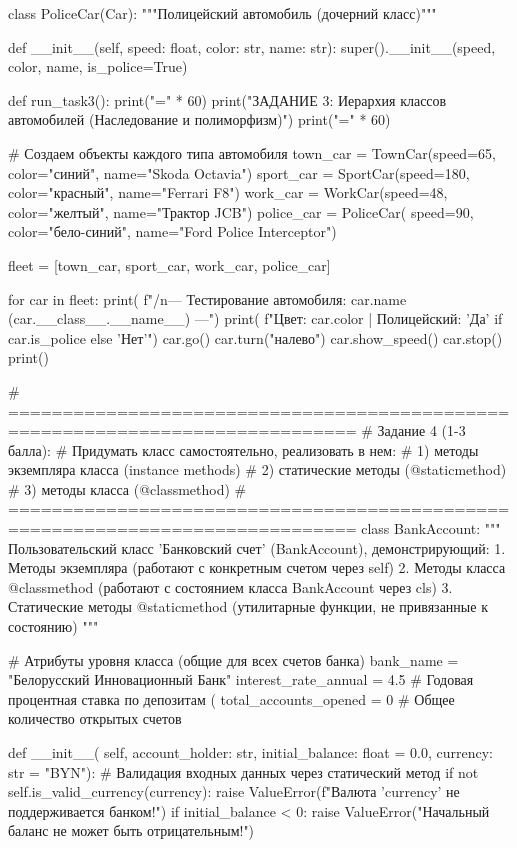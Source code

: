 \documentclass[14pt,a4paper]{extarticle}
\begin{document}
\begin{CodeListing}
class PoliceCar(Car):
    """Полицейский автомобиль (дочерний класс)"""

    def __init__(self, speed: float, color: str, name: str):
        super().__init__(speed, color, name, is_police=True)


def run_task3():
    print("=" * 60)
    print("ЗАДАНИЕ 3: Иерархия классов автомобилей (Наследование и полиморфизм)")
    print("=" * 60)

    # Создаем объекты каждого типа автомобиля
    town_car = TownCar(speed=65, color="синий", name="Skoda Octavia")
    sport_car = SportCar(speed=180, color="красный", name="Ferrari F8")
    work_car = WorkCar(speed=48, color="желтый", name="Трактор JCB")
    police_car = PoliceCar(
        speed=90,
        color="бело-синий",
        name="Ford Police Interceptor")

    fleet = [town_car, sport_car, work_car, police_car]

    for car in fleet:
        print(
            f"/n--- Тестирование автомобиля: {car.name} ({car.__class__.__name__}) ---")
        print(
            f"Цвет: {
                car.color} | Полицейский: {
                'Да' if car.is_police else 'Нет'}")
        car.go()
        car.turn("налево")
        car.show_speed()
        car.stop()
    print()


# ==============================================================================
# Задание 4 (1-3 балла):
# Придумать класс самостоятельно, реализовать в нем:
# 1) методы экземпляра класса (instance methods)
# 2) статические методы (@staticmethod)
# 3) методы класса (@classmethod)
# ==============================================================================
class BankAccount:
    """
    Пользовательский класс 'Банковский счет' (BankAccount), демонстрирующий:
    1. Методы экземпляра (работают с конкретным счетом через self)
    2. Методы класса @classmethod (работают с состоянием класса BankAccount через cls)
    3. Статические методы @staticmethod (утилитарные функции, не привязанные к состоянию)
    """

    # Атрибуты уровня класса (общие для всех счетов банка)
    bank_name = "Белорусский Инновационный Банк"
    interest_rate_annual = 4.5  # Годовая процентная ставка по депозитам (%
    total_accounts_opened = 0   # Общее количество открытых счетов

    def __init__(
            self,
            account_holder: str,
            initial_balance: float = 0.0,
            currency: str = "BYN"):
        # Валидация входных данных через статический метод
        if not self.is_valid_currency(currency):
            raise ValueError(f"Валюта '{currency}' не поддерживается банком!")
        if initial_balance < 0:
            raise ValueError("Начальный баланс не может быть отрицательным!")


\end{CodeListing}
\end{document}
